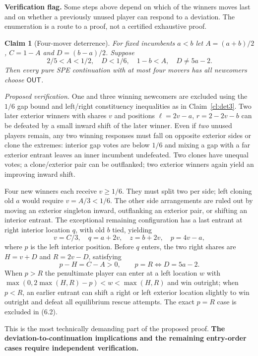 \documentclass[10pt]{article}
\newtheorem{claim}{Claim}
\newcommand{\OUT}{\mathsf{OUT}}
\begin{document}
\textbf{Verification flag.} Some steps above depend on which of the winners moves last and on whether a previously unused player can respond to a deviation. The enumeration is a route to a proof, not a certified exhaustive proof.

\begin{claim}[Four-mover deterrence]\label{cl:det4}
For fixed incumbents $a<b$ let $A=(a+b)/2$, $C=1-A$ and $D=(b-a)/2$. Suppose
\[
 2/5<A<1/2,\quad D<1/6,\quad1-b<A,\quad D\ne5a-2.
\tag{6.2}
\]
Then every pure SPE continuation with at most four movers has all newcomers choose $\OUT$.
\end{claim}
\noindent\emph{Proposed verification.} One and three winning newcomers are excluded using the $1/6$ gap bound and left/right constituency inequalities as in Claim~\ref{cl:det3}. Two later exterior winners with shares $v$ and positions $\ell=2v-a$, $r=2-2v-b$ can be defeated by a small inward shift of the later winner. Even if \emph{two} unused players remain, any two winning responses must fall on opposite exterior sides or clone the extremes: interior gap votes are below $1/6$ and mixing a gap with a far exterior entrant leaves an inner incumbent undefeated. Two clones have unequal votes; a clone/exterior pair can be outflanked; two exterior winners again yield an improving inward shift.

Four new winners each receive $v\ge1/6$. They must split two per side; left cloning old $a$ would require $v=A/3<1/6$. The other side arrangements are ruled out by moving an exterior singleton inward, outflanking an exterior pair, or shifting an interior entrant. The exceptional remaining configuration has a last entrant at right interior location $q$, with old $b$ tied, yielding
\[
 v=C/3,\quad q=a+2v,\quad z=b+2v,\quad p=4v-a,
\]
where $p$ is the left interior position. Before $q$ enters, the two right shares are $H=v+D$ and $R=2v-D$, satisfying
\[
 p-H=C-A>0,\qquad p=R\iff D=5a-2.
\]
When $p>R$ the penultimate player can enter at a left location $w$ with $\max(0,2\max(H,R)-p)<w<\max(H,R)$ and win outright; when $p<R$, an earlier entrant can shift a right or left exterior location slightly to win outright and defeat all equilibrium rescue attempts. The exact $p=R$ case is excluded in (6.2).

This is the most technically demanding part of the proposed proof. \textbf{The deviation-to-continuation implications and the remaining entry-order cases require independent verification.}
\end{document}
